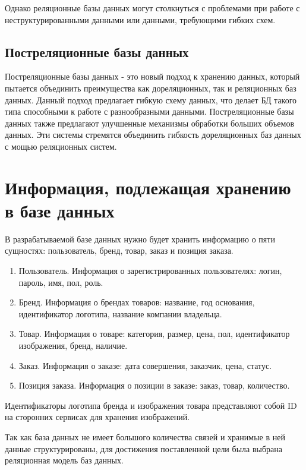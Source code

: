 \documentclass{bmstu}
\begin{document}
Однако реляционные базы данных могут столкнуться с проблемами при работе с неструктурированными данными или данными, требующими гибких схем.

\subsection{Постреляционные базы данных}

Постреляционные базы данных - это новый подход к хранению данных, который пытается объединить преимущества как дореляционных, так и реляционных баз данных. Данный подход предлагает гибкую схему данных, что делает БД такого типа способными к работе с разнообразными данными. Постреляционные базы данных также предлагают улучшенные механизмы обработки больших объемов данных. Эти системы стремятся объединить гибкость дореляционных баз данных с мощью реляционных систем.

\section{Информация, подлежащая хранению в базе данных}

В разрабатываемой базе данных нужно будет хранить информацию о пяти сущностях: пользователь, бренд, товар, заказ и позиция заказа.
\begin{enumerate}
\item Пользователь. 
Информация о зарегистрированных пользователях: логин, пароль, имя, пол, роль.
\item Бренд. 
Информация о брендах товаров: название, год основания, идентификатор логотипа, название компании владельца.
\item Товар. 
Информация о товаре: категория, размер, цена, пол, идентификатор изображения, бренд, наличие.

\pagebreak

\item Заказ.
Информация о заказе: дата совершения, заказчик, цена, статус.
\item Позиция заказа.
Информация о позиции в заказе: заказ, товар, количество.
\end{enumerate}

Идентификаторы логотипа бренда и изображения товара представляют собой ID на сторонних сервисах для хранения изображений.

Так как база данных не имеет большого количества связей и хранимые в ней данные структурированы, для достижения поставленной цели была выбрана реляционная модель баз данных.
\end{document}
